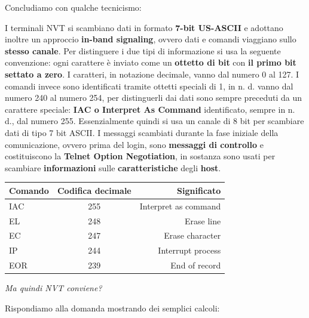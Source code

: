 \documentclass[11pt,a4paper,oneside]{book}
\theoremstyle{definition}
\begin{document}
\begin{flushleft}
	Concludiamo con qualche tecnicismo:
\end{flushleft}
I terminali NVT si scambiano dati in formato \textbf{7-bit US-ASCII} e adottano inoltre un approccio \textbf{in-band signaling}, ovvero dati e comandi viaggiano sullo \textbf{stesso canale}. Per distinguere i due tipi di informazione si usa la seguente convenzione: ogni carattere è inviato come un \textbf{ottetto di bit} con \textbf{il primo bit settato a zero}. I caratteri, in notazione decimale, vanno dal numero 0 al 127. I comandi invece sono identificati tramite  ottetti speciali di 1, in n. d. vanno dal numero 240 al numero 254, per distinguerli dai dati sono sempre preceduti da un carattere speciale: \textbf{IAC o Interpret As Command} identificato, sempre in n. d., dal numero 255. Essenzialmente quindi si usa un canale di 8 bit per scambiare dati di tipo 7 bit ASCII. I messaggi scambiati durante la fase iniziale della comunicazione, ovvero prima del login, sono \textbf{messaggi di controllo} e costituiscono la \textbf{Telnet Option Negotiation}, in sostanza sono usati per scambiare \textbf{informazioni} sulle \textbf{caratteristiche} degli \textbf{host}.
\begin{table}[h!]
	\begin{center}
		\label{tab:table1}
		\begin{tabular}{l|c|r}
			\textbf{Comando} & \textbf{Codifica decimale} & \textbf{Significato} \\
			\hline
			IAC              & 255                        & Interpret as command \\
			EL               & 248                        & Erase line           \\
			EC               & 247                        & Erase character      \\
			IP               & 244                        & Interrupt process    \\
			EOR              & 239                        & End of record        \\
		\end{tabular}
	\end{center}
\end{table}\newline
\begin{flushleft}
	\textit{Ma quindi NVT conviene?}
\end{flushleft}
\begin{flushleft}
	Rispondiamo alla domanda mostrando dei semplici calcoli:
\end{flushleft}
\end{document}
